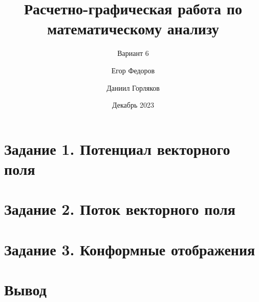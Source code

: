 \documentclass[aspectratio=169]{beamer}
\title[РГР по матанализу]
{Расчетно-графическая работа по математическому анализу}
\subtitle{Вариант 6}
\author[Федоров, Горляков]
{Егор Федоров \and Даниил Горляков}
\institute[ИТМО]{Университет ИТМО}
\date[2023 г.]{Декабрь 2023}
\begin{document}
\frame{\titlepage}

\section{Задание 1. Потенциал векторного поля}


\section{Задание 2. Поток векторного поля}


\section{Задание 3. Конформные отображения}


\section{Вывод}

\end{document}
